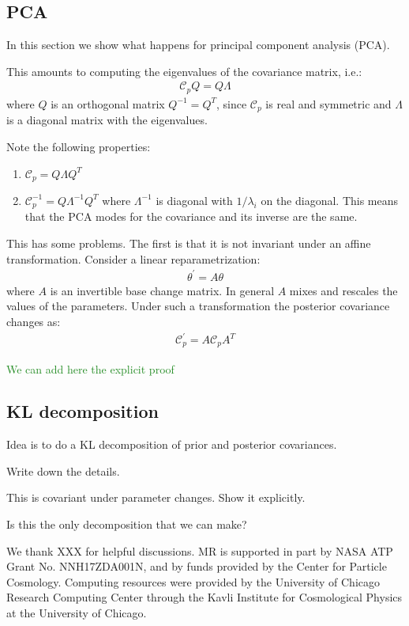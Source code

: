 \documentclass[aps,nofootinbib,notitlepage,superscriptaddress,twocolumn,10pt,prd]{revtex4-1}
\newcommand{\mr}[1]{\textcolor{ForestGreen}{#1}}
\begin{document}
%
\subsection{PCA}
%
In this section we show what happens for principal component analysis (PCA).

This amounts to computing the eigenvalues of the covariance matrix, i.e.:
\begin{align}
\mathcal{C}_p Q = Q \Lambda
\end{align}
where $Q$ is an orthogonal matrix $Q^{-1} = Q^T$, since $\mathcal{C}_p$ is real and symmetric and $\Lambda$ is a diagonal matrix with the eigenvalues.

Note the following properties:
\begin{enumerate}
\item $\mathcal{C}_p = Q \Lambda Q^T$
\item $\mathcal{C}_p^{-1} = Q \Lambda^{-1} Q^T$ where $\Lambda^{-1}$ is diagonal with $1/\lambda_i$ on the diagonal. This means that the PCA modes for the covariance and its inverse are the same.
\end{enumerate}

This has some problems. The first is that it is not invariant under an affine transformation.
Consider a linear reparametrization:
\begin{align}
\theta^\prime = A \theta
\end{align}
where $A$ is an invertible base change matrix. In general $A$ mixes and rescales the values of the parameters.
Under such a transformation the posterior covariance changes as:
\begin{align}
\mathcal{C}_p^\prime = A \mathcal{C}_p A^T
\end{align}

\mr{We can add here the explicit proof}

%
\subsection{KL decomposition}
%

Idea is to do a KL decomposition of prior and posterior covariances.

Write down the details.

This is covariant under parameter changes. Show it explicitly.

Is this the only decomposition that we can make?



%
\begin{acknowledgments}
%
We thank
XXX
for helpful discussions.
%
MR is supported in part by NASA ATP Grant No. NNH17ZDA001N, and by funds provided by the Center for Particle Cosmology.
%
Computing resources were provided by the University of Chicago Research Computing Center through the Kavli Institute for Cosmological Physics at the University of Chicago.
%
\end{acknowledgments}
%


%
\end{document}
